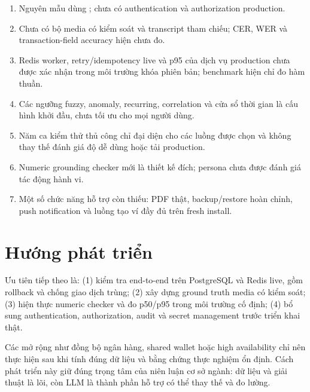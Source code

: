 \begin{enumerate}
  \item Nguyên mẫu dùng ; chưa có authentication và authorization production.
  \item Chưa có bộ media có kiểm soát và transcript tham chiếu; CER, WER và transaction-field accuracy hiện chưa đo.
  \item Redis worker, retry/idempotency live và p95 của dịch vụ production chưa được xác nhận trong môi trường khóa phiên bản; benchmark hiện chỉ đo hàm thuần.
  \item Các ngưỡng fuzzy, anomaly, recurring, correlation và cửa sổ thời gian là cấu hình khởi đầu, chưa tối ưu cho mọi người dùng.
  \item Năm ca kiểm thử thủ công chỉ đại diện cho các luồng được chọn và không thay thế đánh giá độ dễ dùng hoặc tải production.
  \item Numeric grounding checker mới là thiết kế đích; persona chưa được đánh giá tác động hành vi.
  \item Một số chức năng hỗ trợ còn thiếu: PDF thật, backup/restore hoàn chỉnh, push notification và luồng tạo ví đầy đủ trên fresh install.
\end{enumerate}

\section{Hướng phát triển}

Ưu tiên tiếp theo là: (1) kiểm tra end-to-end trên PostgreSQL và Redis live, gồm rollback và chống giao dịch trùng; (2) xây dựng ground truth media có kiểm soát; (3) hiện thực numeric checker và đo p50/p95 trong môi trường cố định; (4) bổ sung authentication, authorization, audit và secret management trước triển khai thật.

Các mở rộng như đồng bộ ngân hàng, shared wallet hoặc high availability chỉ nên thực hiện sau khi tính đúng dữ liệu và bằng chứng thực nghiệm ổn định. Cách phát triển này giữ đúng trọng tâm của niên luận cơ sở ngành: dữ liệu và giải thuật là lõi, còn LLM là thành phần hỗ trợ có thể thay thế và đo lường.
